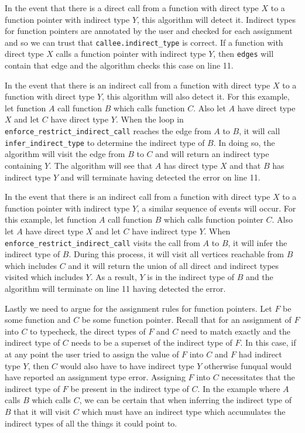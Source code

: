 In the event that there is a direct call from a function with direct type $X$ to a function pointer with indirect type $Y$, this algorithm will detect it.  Indirect types for function pointers are annotated by the user and checked for each assignment and so we can trust that \lstinline{callee.indirect_type} is correct.  If a function with direct type $X$ calls a function pointer with indirect type $Y$, then \lstinline{edges} will contain that edge and the algorithm checks this case on line 11.

In the event that there is an indirect call from a function with direct type $X$ to a function with direct type $Y$, this algorithm will also detect it.  For this example, let function $A$ call function $B$ which calls function $C$.  Also let $A$ have direct type $X$ and let $C$ have direct type $Y$.  When the loop in \lstinline{enforce_restrict_indirect_call} reaches the edge from $A$ to $B$, it will call \lstinline{infer_indirect_type} to determine the indirect type of $B$.  In doing so, the algorithm will visit the edge from $B$ to $C$ and will return an indirect type containing $Y$.  The algorithm will see that $A$ has direct type $X$ and that $B$ has indirect type $Y$ and will terminate having detected the error on line 11.  

In the event that there is an indirect call from a function with direct type $X$ to a function pointer with indirect type $Y$, a similar sequence of events will occur.  For this example, let function $A$ call function $B$ which calls function pointer $C$.  Also let $A$ have direct type $X$ and let $C$ have indirect type $Y$.  When \lstinline{enforce_restrict_indirect_call} visits the call from $A$ to $B$, it will infer the indirect type of $B$. During this process, it will visit all vertices reachable from $B$ which includes $C$ and it will return the union of all direct and indirect types visited which includes $Y$.  As a result, $Y$ is in the indirect type of $B$ and the algorithm will terminate on line 11 having detected the error.

Lastly we need to argue for the assignment rules for function pointers.  Let $F$ be some function and $C$ be some function pointer.  Recall that for an assignment of $F$ into $C$ to typecheck, the direct types of $F$ and $C$ need to match exactly and the indirect type of $C$ needs to be a superset of the indirect type of $F$.  In this case, if at any point the user tried to assign the value of $F$ into $C$ and $F$ had indirect type $Y$, then $C$ would also have to have indirect type $Y$ otherwise funqual would have reported an assignment type error.  Assigning $F$ into $C$ necessitates that the indirect type of $F$ be present in the indirect type of $C$.  In the example where $A$ calls $B$ which calls $C$, we can be certain that when inferring the indirect type of $B$ that it will visit $C$ which must have an indirect type which accumulates the indirect types of all the things it could point to.  

